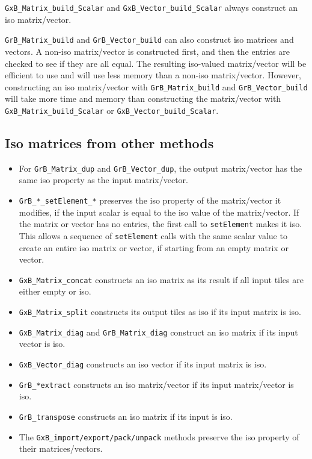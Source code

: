 \documentclass[12pt]{article}
\begin{document}
\verb'GxB_Matrix_build_Scalar' and \verb'GxB_Vector_build_Scalar'
always construct an iso matrix/vector.

\verb'GrB_Matrix_build' and \verb'GrB_Vector_build' can also construct iso
matrices and vectors.  A non-iso matrix/vector is constructed first, and then
the entries are checked to see if they are all equal.  The resulting iso-valued
matrix/vector will be efficient to use and will use less memory than a non-iso
matrix/vector.  However, constructing an iso matrix/vector with
\verb'GrB_Matrix_build' and \verb'GrB_Vector_build' will take more time
and memory than constructing the matrix/vector with
\verb'GxB_Matrix_build_Scalar' or \verb'GxB_Vector_build_Scalar'.

\subsection{Iso matrices from other methods}
\label{iso_other}

\begin{itemize}
\item
For \verb'GrB_Matrix_dup' and \verb'GrB_Vector_dup', the output matrix/vector
has the same iso property as the input matrix/vector.

\item
\verb'GrB_*_setElement_*' preserves the iso property of the matrix/vector it
modifies, if the input scalar is equal to the iso value of the matrix/vector.
If the matrix or vector has no entries, the first call to \verb'setElement'
makes it iso.  This allows a sequence of \verb'setElement' calls with the same
scalar value to create an entire iso matrix or vector, if starting from
an empty matrix or vector.

\item
\verb'GxB_Matrix_concat' constructs an iso matrix as its result if all input
tiles are either empty or iso.

\item
\verb'GxB_Matrix_split' constructs its output tiles as iso if its input
matrix is iso.

\item
\verb'GxB_Matrix_diag' and \verb'GrB_Matrix_diag' construct an iso matrix if
its input vector is iso.

\item
\verb'GxB_Vector_diag' constructs an iso vector if its input matrix is iso.

\item
\verb'GrB_*extract' constructs an iso matrix/vector if its input matrix/vector
is iso.

\item
\verb'GrB_transpose' constructs an iso matrix if its input is iso.

\item
The \verb'GxB_import/export/pack/unpack' methods preserve the iso property
of their matrices/vectors.
\end{itemize}
\end{document}
